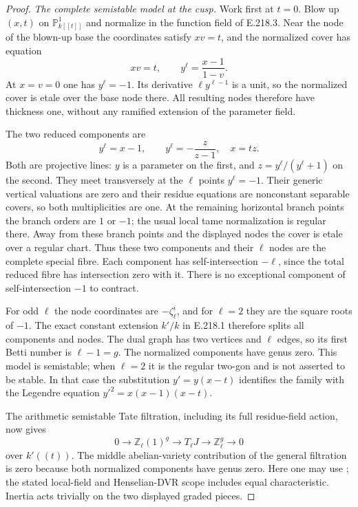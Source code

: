 \begin{proof}
\emph{The complete semistable model at the cusp.}
Work first at $t=0$. Blow up $(x,t)$ on $\mathbb P^1_{k[[t]]}$ and normalize
in the function field of E.218.3. Near the node of the blown-up base the
coordinates satisfy $xv=t$, and the normalized cover has equation
\[
 xv=t,\qquad y^\ell=\frac{x-1}{1-v}.
 \tag{E.218.8}
\]
At $x=v=0$ one has $y^\ell=-1$. Its derivative $\ell y^{\ell-1}$ is a unit,
so the normalized cover is etale over the base node there. All resulting
nodes therefore have thickness one, without any ramified extension of
the parameter field.

The two reduced components are
\[
 y^\ell=x-1,\qquad y^\ell=-\frac{z}{z-1},\quad x=tz.
 \tag{E.218.9}
\]
Both are projective lines: $y$ is a parameter on the first, and
$z=y^\ell/(y^\ell+1)$ on the second. They meet transversely at the $\ell$
points $y^\ell=-1$. Their generic vertical valuations are zero and their
residue equations are nonconstant separable covers, so both multiplicities
are one. At the remaining horizontal branch points the branch orders are
$1$ or $-1$; the usual local tame normalization is regular there. Away from
these branch points and the displayed nodes the cover is etale over a
regular chart. Thus these two components and their $\ell$ nodes are the
complete special fibre. Each component has self-intersection $-\ell$,
since the total reduced fibre has intersection zero with it. There is no
exceptional component of self-intersection $-1$ to contract.

For odd $\ell$ the node coordinates are $-\zeta_\ell^i$, and for $\ell=2$
they are the square roots of $-1$. The exact constant extension $k'/k$ in
E.218.1 therefore splits all components and nodes. The dual graph has
two vertices and $\ell$ edges, so its first Betti number is $\ell-1=g$.
The normalized components have genus zero. This model is semistable;
when $\ell=2$ it is the regular two-gon and is not asserted to be stable.
In that case the substitution $y'=y(x-t)$ identifies the family with the
Legendre equation $y'^2=x(x-1)(x-t)$.

The arithmetic semistable Tate filtration, including its full residue-field
action, now gives
\[
 0\longrightarrow\mathbb Z_\ell(1)^g
 \longrightarrow T_\ell J
 \longrightarrow\mathbb Z_\ell^g\longrightarrow0
 \tag{E.218.10}
\]
over $k'((t))$. The middle abelian-variety contribution of the general
filtration is zero because both normalized components have genus zero.
Here one may use \citet[author pp.~1--2, equations (1.1)--(1.2),
Theorem~1.5 and Corollary~1.6]{AuditDDM2021}; the stated local-field
and Henselian-DVR scope includes equal characteristic. Inertia acts
trivially on the two displayed graded pieces.


\end{proof}
